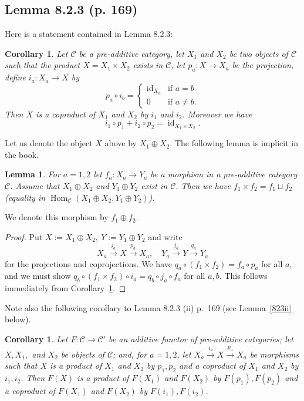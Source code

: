 \documentclass[12pt]{article}%
\newtheorem{lem}[thm]{Lemma}
\newtheorem{cor}[thm]{Corollary}
\theoremstyle{remark}
\theoremstyle{definition}
\newcommand{\C}{\mathcal C}
\newcommand{\xr}{\xrightarrow}
\DeclareMathOperator{\id}{id}
\DeclareMathOperator{\Hom}{Hom}%
\begin{document}

\subsection{Lemma 8.2.3 (p. 169)}

Here is a statement contained in Lemma 8.2.3:
%
\begin{cor}\label{823}
Let $\C$ be a pre-additive category, let $X_1$ and $X_2$ be two objects of $\C$ such that the product $X=X_1\times X_2$ exists in $\C$, let $p_a:X\to X_a$ be the projection, define $i_a:X_a\to X$ by 
$$
p_a\circ i_b=\begin{cases}\id_{X_a}&\text{if }a=b\\0&\text{if }a\not=b.\end{cases}
$$ 
Then $X$ is a coproduct of $X_1$ and $X_2$ by $i_1$ and $i_2$. Moreover we have 
$$
i_1\circ p_1+i_2\circ p_2=\id_{X_1\times X_2}.
$$
\end{cor}

Let us denote the object $X$ above by $X_1\oplus X_2$. The following lemma is implicit in the book. 

\begin{lem}
For $a=1,2$ let $f_a:X_a\to Y_a$ be a morphism in a pre-additive category $\C$. Assume that $X_1\oplus X_2$ and $Y_1\oplus Y_2$ exist in $\C$. Then we have $f_1\times f_2=f_1\sqcup f_2$ (equality in $\Hom_\C(X_1\oplus X_2,Y_1\oplus Y_2)$). 
\end{lem} 

We denote this morphism by $f_1\oplus f_2$.\medskip 

\begin{proof}
Put $X:=X_1\oplus X_2,\ Y:=Y_1\oplus Y_2$ and write 
$$
X_a\xr{i_a}X\xr{p_a}X_a,\quad Y_a\xr{j_a}Y\xr{q_a}Y_a
$$ 
for the projections and coprojections. We have $q_a\circ(f_1\times f_2)=f_a\circ p_a$ for all $a$, and we must show $q_b\circ (f_1\times f_2)\circ i_a=q_b\circ j_a\circ f_a$ for all $a,b$. This follows immediately from Corollary~\ref{823}.
\end{proof}

Note also the following corollary to Lemma 8.2.3 (ii) p.~169 (see Lemma~\ref{823ii} below). 
%
\begin{cor}\label{823b}
Let $F:\C\to\C'$ be an additive functor of pre-additive categories; let $X,X_1,$ and $X_2$ be objects of $\C$; and, for $a=1,2$, let $X_a\xr{i_a}X\xr{p_a}X_a$ be morphisms such that $X$ is a product of $X_1$ and $X_2$ by $p_1,p_2$ and a coproduct of $X_1$ and $X_2$ by $i_1,i_2$. Then $F(X)$ is a product of $F(X_1)$ and $F(X_2)$ by $F(p_1),F(p_2)$ and a coproduct of $F(X_1)$ and $F(X_2)$ by $F(i_1),F(i_2)$. 
\end{cor}
\end{document}
